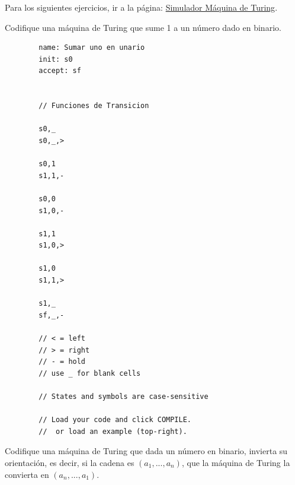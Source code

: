 \documentclass[12pt]{report}
\newcounter{it}
\theoremstyle{largebreak}
\begin{document}
    Para los siguientes ejercicios, ir a la página: \href{https://turingmachinesimulator.com/}{Simulador Máquina de Turing}.

    \begin{excer}
        Codifique una máquina de Turing que sume 1 a un número dado en binario.
    \end{excer}

    \begin{lstlisting}
        name: Sumar uno en unario
        init: s0
        accept: sf

        
        // Funciones de Transicion

        s0,_
        s0,_,>

        s0,1
        s1,1,-

        s0,0
        s1,0,-

        s1,1
        s1,0,>

        s1,0
        s1,1,>

        s1,_
        sf,_,-

        // < = left
        // > = right
        // - = hold
        // use _ for blank cells

        // States and symbols are case-sensitive

        // Load your code and click COMPILE.
        //  or load an example (top-right).
    \end{lstlisting}

    \begin{excer}
        Codifique una máquina de Turing que dada un número en binario, invierta su orientación, es decir, si la cadena es $(a_1,...,a_n)$, que la máquina de Turing la convierta en $(a_n,...,a_1)$. 
    \end{excer}
\end{document}

